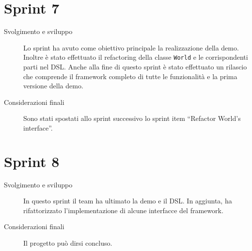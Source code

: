 \section{Sprint 7}\label{sec:sprint-7}
\begin{description}
    \item[Svolgimento e sviluppo] Lo sprint ha avuto come obiettivo principale la realizzazione della demo.
    Inoltre è stato effettuato il refactoring della classe \texttt{World} e le corrispondenti parti nel DSL\@.
    Anche alla fine di questo sprint è stato effettuato un rilascio che comprende il framework completo di tutte le funzionalità e la prima versione della demo.
    \item[Considerazioni finali] Sono stati spostati allo sprint successivo lo sprint item ``Refactor World's interface''.
\end{description}
\section{Sprint 8}\label{sec:sprint-8}
\begin{description}
    \item[Svolgimento e sviluppo] In questo sprint il team ha ultimato la demo e il DSL. In aggiunta, ha rifattorizzato l'implementazione di alcune interfacce del framework.
    \item[Considerazioni finali] Il progetto può dirsi concluso.
\end{description}